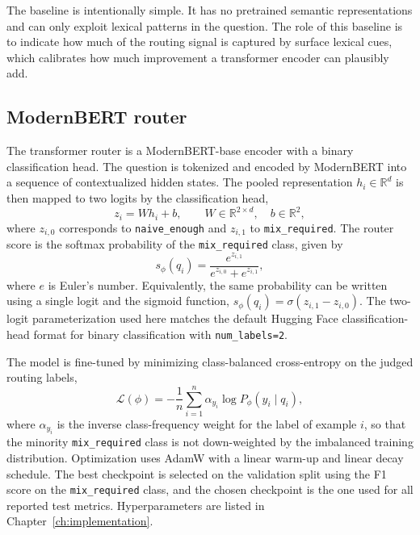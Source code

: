\documentclass[english, bibtex]{kththesis}               %
\numberwithin{listing}{chapter}
\begin{document}
The baseline is intentionally simple. It has no pretrained semantic representations and can only exploit lexical patterns in the question. The role of this baseline is to indicate how much of the routing signal is captured by surface lexical cues, which calibrates how much improvement a transformer encoder can plausibly add.

\subsection{ModernBERT router}
\label{sec:methodModernBert}

The transformer router is a ModernBERT-base \cite{warner2024modernbert} encoder with a binary classification head. The question is tokenized and encoded by ModernBERT into a sequence of contextualized hidden states. The pooled representation \(h_i \in \mathbb{R}^{d}\) is then mapped to two logits by the classification head,
\begin{equation}
\label{eq:modernBertLogits}
z_i = W h_i + b,
\qquad
W \in \mathbb{R}^{2 \times d}, \quad b \in \mathbb{R}^{2},
\end{equation}
where \(z_{i,0}\) corresponds to \texttt{naive\_enough} and \(z_{i,1}\) to \texttt{mix\_required}. The router score is the softmax probability of the \texttt{mix\_required} class, given by
\begin{equation}
\label{eq:modernBertSoftmax}
s_\phi(q_i)
=
\frac{e^{z_{i,1}}}{e^{z_{i,0}} + e^{z_{i,1}}},
\end{equation}
where $e$ is Euler's number. Equivalently, the same probability can be written using a single logit and the sigmoid function, $s_\phi(q_i) = \sigma(z_{i,1} - z_{i,0})$. The two-logit parameterization used here matches the default Hugging Face classification-head format for binary classification with \texttt{num\_labels=2}.

The model is fine-tuned by minimizing class-balanced cross-entropy on the judged routing labels,
\begin{equation}
\label{eq:modernBertLoss}
\mathcal{L}(\phi)
=
-\frac{1}{n}\sum_{i=1}^{n}
\alpha_{y_i} \log P_\phi(y_i \mid q_i),
\end{equation}
where \(\alpha_{y_i}\) is the inverse class-frequency weight for the label of example \(i\), so that the minority \texttt{mix\_required} class is not down-weighted by the imbalanced training distribution. Optimization uses AdamW \cite{loshchilov2019decoupled} with a linear warm-up and linear decay schedule. The best checkpoint is selected on the validation split using the F1 score on the \texttt{mix\_required} class, and the chosen checkpoint is the one used for all reported test metrics. Hyperparameters are listed in Chapter~\ref{ch:implementation}.
\end{document}
